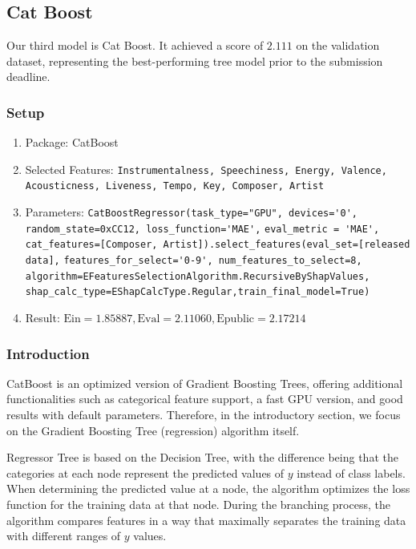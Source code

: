 \documentclass[10pt,letterpaper]{article}
\begin{document}
\subsection{Cat Boost}

Our third model is Cat Boost. It achieved a score of $2.111$ on the validation dataset, representing the best-performing tree model prior to the submission deadline. 

\subsubsection{Setup}

\begin{enumerate}
	\item Package: CatBoost
	\item Selected Features: \texttt{Instrumentalness, Speechiness, Energy, Valence, Acousticness, Liveness, Tempo, Key, Composer, Artist}
	\item Parameters: \verb|CatBoostRegressor(task_type="GPU", devices='0', random_state=0xCC12, loss_function='MAE',|\linebreak
						\verb|eval_metric = 'MAE', cat_features=[Composer, Artist]).select_features(eval_set=[released data],|\linebreak
						\verb|features_for_select='0-9', num_features_to_select=8,|\linebreak
						\verb|algorithm=EFeaturesSelectionAlgorithm.RecursiveByShapValues,|\linebreak
						\verb|shap_calc_type=EShapCalcType.Regular,train_final_model=True)|
	\item Result: $\text{Ein} = 1.85887, \text{Eval} = 2.11060, \text{Epublic} = 2.17214$
\end{enumerate}

\subsubsection{Introduction}

CatBoost is an optimized version of Gradient Boosting Trees, offering additional functionalities such as categorical feature support, a fast GPU version, and good results with default parameters. Therefore, in the introductory section, we focus on the Gradient Boosting Tree (regression) algorithm itself.

Regressor Tree is based on the Decision Tree, with the difference being that the categories at each node represent the predicted values of $y$ instead of class labels. When determining the predicted value at a node, the algorithm optimizes the loss function for the training data at that node. During the branching process, the algorithm compares features in a way that maximally separates the training data with different ranges of $y$ values.
\end{document}
